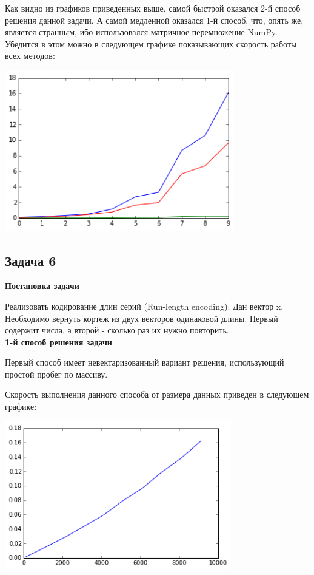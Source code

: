 \documentclass[12pt, a4paper]{article}
\begin{document}
				Как видно из графиков приведенных выше, самой быстрой оказался 2-й способ решения данной задачи. А самой медленной оказался 1-й способ, что, опять же, является странным, ибо использовался матричное перемножение NumPy. Убедится в этом можно в следующем графике показывающих скорость работы всех методов:
				\begin{center}
					\includegraphics[height=7cm]{timeit/num5_ti123.png}
				\end{center}



		\newpage
		\subsection{Задача 6}

			{\bf Постановка задачи\\}

				Реализовать кодирование длин серий (Run-length encoding). Дан вектор x. Необходимо вернуть кортеж из двух векторов одинаковой длины. Первый содержит числа, а второй - сколько раз их нужно повторить. \\

			{\bf 1-й способ решения задачи\\}

				Первый способ имеет невектаризованный вариант решения, использующий простой пробег по массиву.

				Скорость выполнения данного способа от размера данных приведен в следующем графике:
				\begin{center}
					\includegraphics[height=6.5cm]{timeit/num6_ti1.png}
				\end{center}
\end{document}
